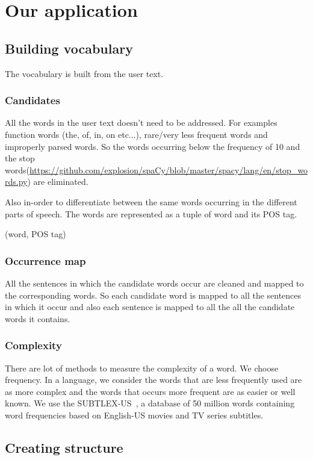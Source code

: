 \documentclass[11pt,a4paper]{article}
\begin{document}
\section{Our application}

\subsection{Building vocabulary}
The vocabulary is built from the user text.

\subsubsection{Candidates}
All the words in the user text doesn't need to be addressed. For examples 
function words (the, of, in, on etc...), rare/very less frequent words and
improperly parsed words. So the words occurring below the frequency of 10 and
the stop words(\url{https://github.com/explosion/spaCy/blob/master/spacy/lang/en/stop_words.py}) are eliminated. 

Also in-order to differentiate between the same words occurring in the
different parts of speech. The words are represented as a tuple of word and its
POS tag.
\begin{center}(word, POS tag)\end{center}

\subsubsection{Occurrence map}
All the sentences in which the candidate words occur are cleaned and mapped to
the corresponding words. So each candidate word is mapped to all the sentences
in which it occur and also each sentence is mapped to all the all the candidate
words it contains.

\subsubsection{Complexity}
There are lot of methods to measure the complexity of a word. We choose frequency.
In a language, we consider the words that are less frequently used are as
more complex and the words that occurs more frequent are as easier or well known.
We use the SUBTLEX-US~\cite{brysbaert2009moving}, a database of 50 million
words containing word frequencies based on English-US movies and TV series subtitles.

\subsection{Creating structure}
\end{document}
